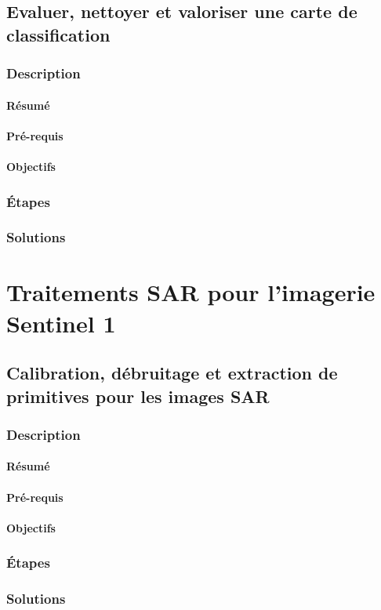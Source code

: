 \documentclass[a4paper,11pt,twoside,openright]{article}
\begin{document}
\subsection{Evaluer, nettoyer et valoriser une carte de classification}
\label{sec-4-2}
\subsubsection{Description}
\label{sec-4-2-1}
\paragraph{Résumé}
\label{sec-4-2-1-1}

\paragraph{Pré-requis}
\label{sec-4-2-1-2}


\paragraph{Objectifs}
\label{sec-4-2-1-3}

\subsubsection{Étapes}
\label{sec-4-2-2}

\subsubsection{Solutions}
\label{sec-4-2-3}
\section{Traitements SAR pour l'imagerie Sentinel 1}
\label{sec-5}
\subsection{Calibration, débruitage et extraction de primitives pour les images SAR}
\label{sec-5-1}
\subsubsection{Description}
\label{sec-5-1-1}
\paragraph{Résumé}
\label{sec-5-1-1-1}

\paragraph{Pré-requis}
\label{sec-5-1-1-2}


\paragraph{Objectifs}
\label{sec-5-1-1-3}

\subsubsection{Étapes}
\label{sec-5-1-2}

\subsubsection{Solutions}
\label{sec-5-1-3}
\end{document}
